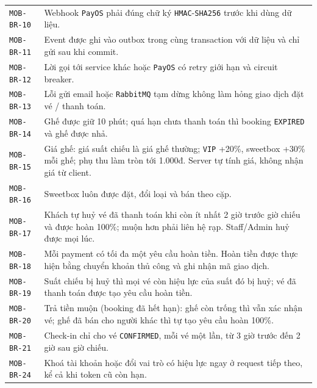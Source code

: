 \begin{longtable}{@{}P{0.23000\SRSWidth}P{0.77000\SRSWidth}@{}}
\texttt{MOB-\allowbreak{}BR-\allowbreak{}10} & Webhook \texttt{Pay\allowbreak{}OS} phải đúng chữ ký \texttt{HMAC}-\texttt{SHA256} trước khi dùng dữ liệu. \\[3pt]
\texttt{MOB-\allowbreak{}BR-\allowbreak{}11} & Event được ghi vào outbox trong cùng transaction với dữ liệu và chỉ gửi sau khi commit. \\[3pt]
\texttt{MOB-\allowbreak{}BR-\allowbreak{}12} & Lời gọi tới service khác hoặc \texttt{Pay\allowbreak{}OS} có retry giới hạn và circuit breaker. \\[3pt]
\texttt{MOB-\allowbreak{}BR-\allowbreak{}13} & Lỗi gửi email hoặc \texttt{Rabbit\allowbreak{}MQ} tạm dừng không làm hỏng giao dịch đặt vé /\allowbreak{} thanh toán. \\[3pt]
\texttt{MOB-\allowbreak{}BR-\allowbreak{}14} & Ghế được giữ 10 phút; quá hạn chưa thanh toán thì booking \texttt{EXPIRED} và ghế được nhả. \\[3pt]
\texttt{MOB-\allowbreak{}BR-\allowbreak{}15} & Giá ghế: giá suất chiếu là giá ghế thường; \texttt{VIP} +20\%, sweetbox +30\% mỗi ghế; phụ thu làm tròn tới 1.000đ. Server tự tính giá, không nhận giá từ client. \\[3pt]
\texttt{MOB-\allowbreak{}BR-\allowbreak{}16} & Sweetbox luôn được đặt, đổi loại và bán theo cặp. \\[3pt]
\texttt{MOB-\allowbreak{}BR-\allowbreak{}17} & Khách tự huỷ vé đã thanh toán khi còn ít nhất 2 giờ trước giờ chiếu và được hoàn 100\%; muộn hơn phải liên hệ rạp. Staff/\allowbreak{}Admin huỷ được mọi lúc. \\[3pt]
\texttt{MOB-\allowbreak{}BR-\allowbreak{}18} & Mỗi payment có tối đa một yêu cầu hoàn tiền. Hoàn tiền được thực hiện bằng chuyển khoản thủ công và ghi nhận mã giao dịch. \\[3pt]
\texttt{MOB-\allowbreak{}BR-\allowbreak{}19} & Suất chiếu bị huỷ thì mọi vé còn hiệu lực của suất đó bị huỷ; vé đã thanh toán được tạo yêu cầu hoàn tiền. \\[3pt]
\texttt{MOB-\allowbreak{}BR-\allowbreak{}20} & Trả tiền muộn (booking đã hết hạn): ghế còn trống thì vẫn xác nhận vé; ghế đã bán cho người khác thì tự tạo yêu cầu hoàn 100\%. \\[3pt]
\texttt{MOB-\allowbreak{}BR-\allowbreak{}21} & Check-in chỉ cho vé \texttt{CONFIRME\allowbreak{}D}, mỗi vé một lần, từ 3 giờ trước đến 2 giờ sau giờ chiếu. \\[3pt]
\texttt{MOB-\allowbreak{}BR-\allowbreak{}24} & Khoá tài khoản hoặc đổi vai trò có hiệu lực ngay ở request tiếp theo, kể cả khi token cũ còn hạn. \\[3pt]

\end{longtable}
